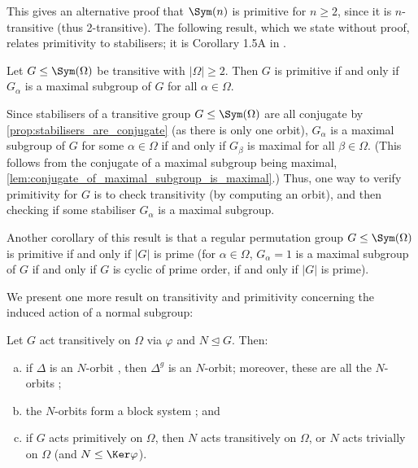 This gives an alternative proof that $\Sym(n)$ is primitive for $n \geq 2$, since it is $n$-transitive (thus 2-transitive).  The following result, which we state without proof, relates primitivity to stabilisers; it is Corollary 1.5A in \cite{dixon_mortimer_perm_groups1996}.

\begin{proposition}\label{prop:primitive_iff_stabilisers_maximal}
    Let $G \leq \Sym(\Omega)$ be transitive with $|\Omega| \geq 2$. Then $G$ is primitive if and only if $G_\alpha$ is a maximal subgroup of $G$ for all $\alpha \in \Omega$.
\end{proposition}

Since stabilisers of a transitive group $G \leq \Sym(\Omega)$ are all conjugate by \autoref{prop:stabilisers_are_conjugate} (as there is only one orbit), $G_\alpha$ is a maximal subgroup of $G$ for some $\alpha \in \Omega$ if and only if $G_\beta$ is maximal for all $\beta \in \Omega$. (This follows from the conjugate of a maximal subgroup being maximal, \autoref{lem:conjugate_of_maximal_subgroup_is_maximal}.) Thus, one way to verify primitivity for $G$ is to check transitivity (by computing an orbit), and then checking if some stabiliser $G_\alpha$ is a maximal subgroup.

Another corollary of this result is that a regular permutation group $G \leq \Sym(\Omega)$ is primitive if and only if $|G|$ is prime (for $\alpha \in \Omega$, $G_\alpha = 1$ is a maximal subgroup of $G$ if and only if $G$ is cyclic of prime order, if and only if $|G|$ is prime). 

We present one more result on transitivity and primitivity concerning the induced action of a normal subgroup:

\begin{proposition}\label{prop:normal_subgroup_transitive_action}
    Let $G$ act transitively on $\Omega$ via $\varphi$ and $N \unlhd G$. Then:
    \begin{enumerate}[(a)]
        \item if $\Delta$ is an $N$-orbit , then $\Delta^g$ is an $N$-orbit; moreover, these are all the $N$-orbits ;
        \item the $N$-orbits form a block system ; and
        \item if $G$ acts primitively on $\Omega$, then $N$ acts transitively on $\Omega$, or $N$ acts trivially on $\Omega$ (and $N \leq \Ker\varphi$).
    \end{enumerate}
\end{proposition}

